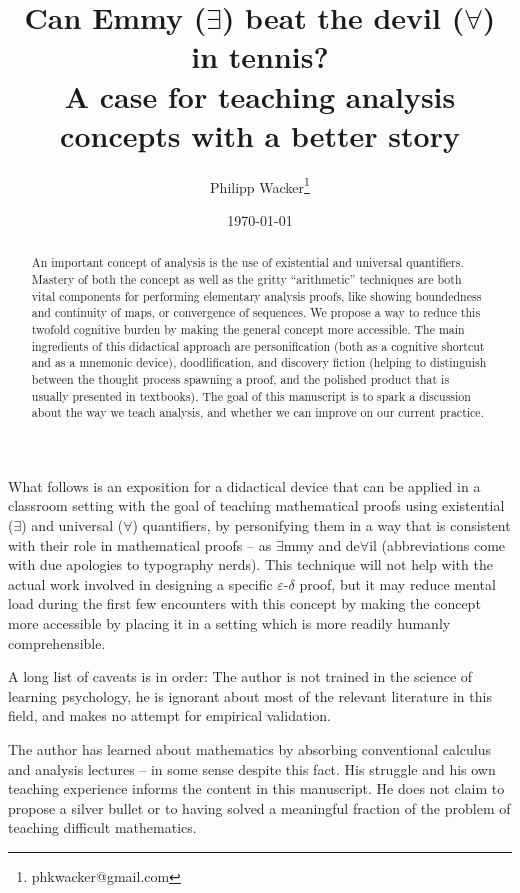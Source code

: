 \documentclass[11pt]{article}
\date \today
\title{Can Emmy ($\exists$) beat the devil ($\forall$) in tennis? \\[0.5em] \large A case for teaching analysis concepts with a better story}
\author{Philipp Wacker\thanks{phkwacker@gmail.com}}
\theoremstyle{plain}
\theoremstyle{definition}
\theoremstyle{remark}
\numberwithin{equation}{section}
\newcommand{\e}{\exists}
\newcommand{\f}{\forall}
\begin{document}
\maketitle
\begin{abstract}
    An important concept of analysis is the use of existential and universal quantifiers. Mastery of both the concept as well as the gritty ``arithmetic'' techniques are both vital components for performing elementary analysis proofs, like showing boundedness and continuity of maps, or convergence of sequences. We propose a way to reduce this twofold cognitive burden by making the general concept more accessible. The main ingredients of this didactical approach are personification (both as a cognitive shortcut and as a mnemonic device), doodlification, and discovery fiction (helping to distinguish between the thought process spawning a proof, and the polished product that is usually presented in textbooks).
The goal of this manuscript is to spark a discussion about the way we teach analysis, and whether we can improve on our current practice. 
\end{abstract}



    What follows is an exposition for a didactical device that can be applied in a classroom setting with the goal of teaching mathematical proofs using existential ($\exists$) and universal ($\forall$) quantifiers, by personifying them in a way that is consistent with their role in mathematical proofs -- as $\e$mmy and de$\f$il (abbreviations come with due apologies to typography nerds). This technique will not help with the actual work involved in designing a specific $\varepsilon$-$\delta$ proof, but it may reduce mental load during the first few encounters with this concept by making the concept more accessible by placing it in a setting which is more readily humanly comprehensible.

    A long list of caveats is in order: The author is not trained in the science of learning psychology, he is ignorant about most of the relevant literature in this field, and makes no attempt for empirical validation.

    The author has learned about mathematics by absorbing conventional calculus and analysis lectures -- in some sense despite this fact. His struggle and his own teaching experience informs the content in this manuscript. He does not claim to propose a silver bullet or to having solved a meaningful fraction of the problem of teaching difficult mathematics.
\end{document}

